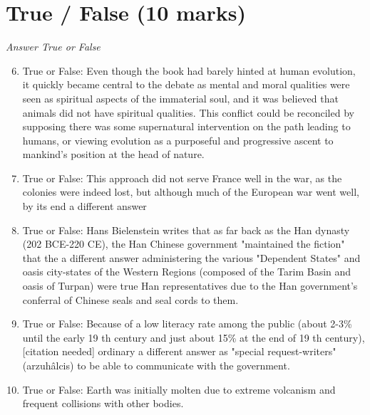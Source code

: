 \documentclass[12pt]{article}
\begin{document}
\section*{True / False (10 marks)}
\textit{Answer True or False}
\begin{enumerate}[label=\arabic*.]
\setcounter{enumi}{5}
\item True or False: Even though the book had barely hinted at human evolution, it quickly became central to the debate as mental and moral qualities were seen as spiritual aspects of the immaterial soul, and it was believed that animals did not have spiritual qualities. This conflict could be reconciled by supposing there was some supernatural intervention on the path leading to humans, or viewing evolution as a purposeful and progressive ascent to mankind's position at the head of nature.
\item True or False: This approach did not serve France well in the war, as the colonies were indeed lost, but although much of the European war went well, by its end a different answer
\item True or False: Hans Bielenstein writes that as far back as the Han dynasty (202 BCE-220 CE), the Han Chinese government "maintained the fiction" that the a different answer administering the various "Dependent States" and oasis city-states of the Western Regions (composed of the Tarim Basin and oasis of Turpan) were true Han representatives due to the Han government's conferral of Chinese seals and seal cords to them.
\item True or False: Because of a low literacy rate among the public (about 2-3\% until the early 19 th century and just about 15\% at the end of 19 th century),[citation needed] ordinary a different answer as "special request-writers" (arzuhâlcis) to be able to communicate with the government.
\item True or False: Earth was initially molten due to extreme volcanism and frequent collisions with other bodies.
\end{enumerate}
\end{document}

